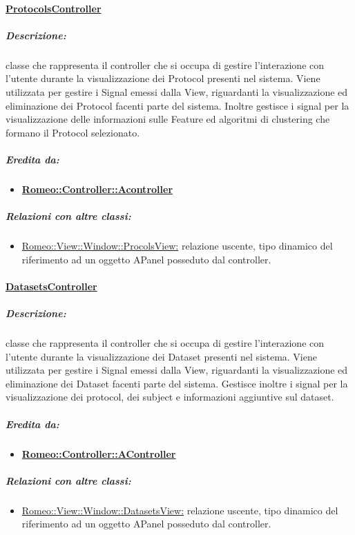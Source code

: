 	\paragraph{\underline{ProtocolsController}}
	\label{controller_sp}
		\subparagraph{Descrizione:} classe che rappresenta il controller che si occupa di gestire l'interazione con l'utente durante la visualizzazione dei Protocol\glossario{} presenti nel sistema. Viene utilizzata per gestire i Signal emessi dalla View, riguardanti la visualizzazione ed eliminazione dei Protocol\glossario{} facenti parte del sistema. Inoltre gestisce i signal per la visualizzazione delle informazioni sulle Feature\glossario{} ed algoritmi di clustering\glossario{} che formano il Protocol\glossario{} selezionato.
		\subparagraph{Eredita da:} 
			\begin{itemize}
				\item \textbf{\hyperref[controller_a]{Romeo::Controller::Acontroller}}
			\end{itemize}
		\subparagraph{Relazioni con altre classi:}
			\begin{itemize}
				\item \hyperref[vpv]{Romeo::View::Window::ProcolsView:} relazione uscente, tipo dinamico del riferimento ad un oggetto APanel posseduto dal controller.
			\end{itemize}
		
		
	\paragraph{\underline{DatasetsController}}
	\label{controller_sd} 
		\subparagraph{Descrizione:} classe che rappresenta il controller che si occupa di gestire l'interazione con l'utente durante la visualizzazione dei Dataset\glossario{} presenti nel sistema. Viene utilizzata per gestire i Signal emessi dalla View, riguardanti la visualizzazione ed eliminazione dei Dataset\glossario{} facenti parte del sistema. Gestisce inoltre i signal per la visualizzazione dei protocol, dei subject e informazioni aggiuntive sul dataset.
		\subparagraph{Eredita da:}
			\begin{itemize}
				\item \textbf{\hyperref[controller_a]{Romeo::Controller::AController}}
			\end{itemize}	
		\subparagraph{Relazioni con altre classi:}
			\begin{itemize}
				\item \hyperref[vdv]{Romeo::View::Window::DatasetsView:} relazione uscente, tipo dinamico del riferimento ad un oggetto APanel posseduto dal controller.
			\end{itemize}
		
